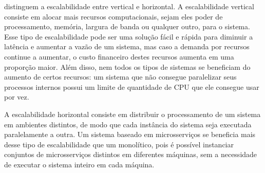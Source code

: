 
\cite{4228359} distinguem a escalabilidade entre vertical e horizontal. A escalabilidade vertical consiste em alocar mais recursos computacionais, sejam eles poder de processamento, memória, largura de banda ou qualquer outro, para o sistema. Esse tipo de escalabilidade pode ser uma solução fácil e rápida para diminuir a latência e aumentar a vazão de um sistema, mas caso a demanda por recursos continue a aumentar, o custo financeiro destes recursos aumenta em uma proporção maior. Além disso, nem todos os tipos de sistemas se beneficiam do aumento de certos recursos: um sistema que não consegue paralelizar seus processos internos possui um limite de quantidade de CPU que ele consegue usar por vez. 


A escalabilidade horizontal consiste em distribuir o processamento de um sistema em ambientes distintos, de modo que cada instância do sistema seja executada paralelamente a outra. Um sistema baseado em microsserviços se beneficia mais desse tipo de escalabilidade que um monolítico, pois é possível instanciar conjuntos de microsserviços distintos em diferentes máquinas, sem a necessidade de executar o sistema  inteiro em cada máquina. 


